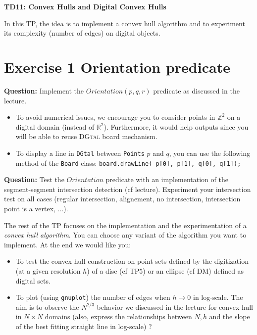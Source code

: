 \documentclass[a4paper, 11pt]{article}
\title{}
\author{}
\date{}
\begin{document}
\begin{center}
	\LARGE \textbf{TD11: Convex Hulls and Digital Convex Hulls}
\end{center}

\bigskip
\par In this TP, the idea is to implement a convex hull algorithm and to experiment its complexity (number of edges) on digital objects.

\section*{Exercise 1 \rm Orientation predicate}

{\bf Question:} Implement the $Orientation(p,q,r)$ predicate as discussed in the lecture.
	\begin{itemize}
	\item To avoid numerical issues, we encourage you to consider points in $\mathbb{Z}^2$ on a digital domain (instead of $\mathbb{R}^2$). Furthermore, it would help outputs since you will be able to reuse \textsc{DGtal} board mechanism. 
	\item To display a line in \texttt{DGtal} between \texttt{Points} $p$ and $q$, you can use the following method of the \texttt{Board} class: \texttt{board.drawLine( p[0], p[1], q[0], q[1]);}
	\end{itemize}

{\bf Question:} Test the $Orientation$ predicate with an implementation of the segment-segment intersection detection (cf lecture). Experiment your intersection test on all cases (regular intersection, alignement, no intersection, intersection point is a vertex, ...).


\bigskip
\bigskip
\bigskip

\par The rest of the TP focuses on the implementation and the experimentation of a \emph{convex hull algorithm}. You can choose any variant of the algorithm you want to implement. At the end we would like you:
	\begin{itemize}
	\item To test the convex hull construction on point sets defined by the digitization (at a given resolution $h$) of a disc (cf TP5) or an ellipse (cf DM) defined as digital sets.
	\item To plot (using \texttt{gnuplot}) the number of edges when $h\rightarrow 0$ in log-scale. The aim is to observe the $N^{2/3}$ behavior we discussed in the lecture for convex hull in $N\times N$ domains (also, express the relationships between $N, h$ and the slope of the best fitting straight line in log-scale) ?
	\end{itemize}
\end{document}
